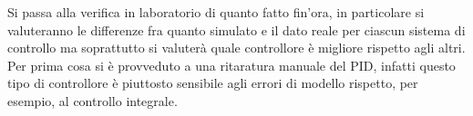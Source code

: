 		Si passa alla verifica in laboratorio di quanto fatto fin'ora, in particolare si valuteranno le differenze fra quanto simulato e il dato reale per ciascun sistema di controllo ma soprattutto si  valuterà quale controllore è migliore rispetto agli altri. Per prima cosa si è provveduto a una ritaratura manuale del PID, infatti questo tipo di controllore è piuttosto sensibile agli errori di modello rispetto, per esempio, al controllo  integrale.
		
		
		\begin{center}
		\end{center}
		
		
		
		
		